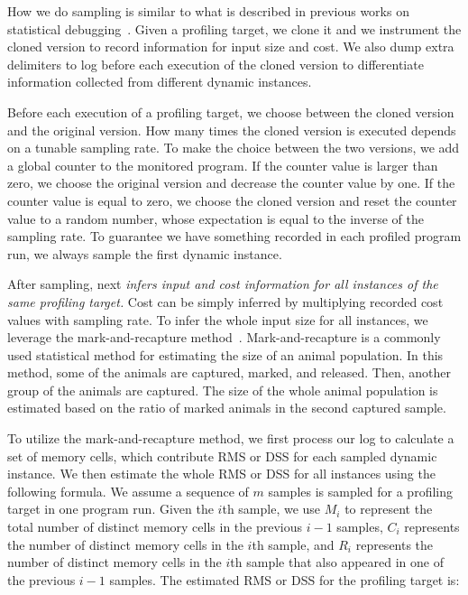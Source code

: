 {{How we do sampling is similar to what is described in previous works 
on statistical debugging~\cite{liblit03,liblit05,CCI,SongOOPSLA2014,ldoctor}.
Given a profiling target, 
we clone it
and we instrument the cloned version to record information for input size and cost.
We also dump extra delimiters to log before each 
execution of the cloned version
to differentiate information collected from different dynamic instances. 

Before each execution of a profiling target, 
we choose between the cloned version and the original version. 
How many times the cloned version is executed 
depends on a tunable sampling rate. 
To make the choice between the two versions,
we add a global counter to the monitored program. 
If the counter value is larger than zero, 
we choose the original version and decrease the counter value by one.
If the counter value is equal to zero,
we choose the cloned version and reset the counter value to 
a random number, 
whose expectation is 
equal to the inverse of the sampling rate.  
To guarantee we have something recorded in 
each profiled program run,
we always sample the first dynamic instance. 




After sampling, \Tool next \emph{infers input and cost information
for all instances of the same profiling target.} 
Cost can be simply inferred by multiplying recorded cost values with sampling rate.
To infer the whole input size for all instances, 
we leverage the mark-and-recapture method~\cite{mark-recapture}. 
Mark-and-recapture is a commonly used statistical method 
for estimating the size of an animal population. 
In this method, some of the animals are captured, marked, and released. 
Then, another group of the animals are captured.
The size of the whole animal population is estimated 
based on the ratio of marked animals in the second captured sample. 
 

To utilize the mark-and-recapture method, 
we first process our log to calculate a set of memory cells, 
which contribute RMS
or DSS for each sampled dynamic instance. 
We then estimate the whole RMS or DSS for all instances using the following formula.
We assume a sequence of $m$ samples is sampled for a profiling target 
in one program run.
Given the $i$th sample, we use $M_i$ to represent the 
total number of distinct memory cells in the previous $i-1$ samples, 
$C_i$ represents the number of distinct memory cells in the $i$th sample,
and $R_i$ represents the number of distinct memory cells in 
the $i$th sample that also appeared in one of the previous $i-1$ samples.
The estimated RMS or DSS for the profiling target is:


}}
